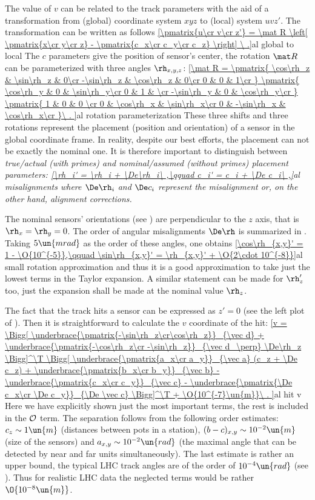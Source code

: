 The value of $v$ can be related to the track parameters with the aid of a transformation from (global) coordinate system $xyz$ to (local) system $uvz'$. The transformation can be written as follows
\eqref{\pmatrix{u\cr v\cr z'} = \mat R \left[ \pmatrix{x\cr y\cr z}  - \pmatrix{c_x\cr c_y\cr c_z}  \right] \ .}{al global to local}
The $c$ parameters give the position of sensor's center, the rotation $\mat R$ can be parameterized with three angles $\rh_{x,y,z}$:
\eqref{\mat R =
	\pmatrix{
		\cos\rh_z  & \sin\rh_z & 0\cr
		-\sin\rh_z & \cos\rh_z & 0\cr
		0		   & 0         & 1\cr
	}
	\pmatrix{
		\cos\rh_y  & 0 & \sin\rh_y\cr
		0		   & 1 &          \cr
		-\sin\rh_y & 0 & \cos\rh_y\cr
	}
	\pmatrix{
		1 & 0		   & 0        \cr
		0 & \cos\rh_x  & \sin\rh_x\cr
		0 & -\sin\rh_x & \cos\rh_x\cr
	}\ .
}{al rotation parameterization}
These three shifts and three rotations represent the placement (position and orientation) of a sensor in the global coordinate frame. In reality, despite our best efforts, the placement can not be exactly the nominal one. It is therefore important to distinguish between \em{true/actual} (with primes) and \em{nominal/assumed} (without primes) placement parameters:
\eqref{\rh_i' = \rh_i + \De\rh_i\ ,\qquad c_i' = c_i + \De c_i\ ,}{al misalignments}
where $\De\rh_i$ and $\De c_i$ represent the \em{misalignment} or, on the other hand, \em{alignment corrections}.

The nominal sensors' orientations (see ) are perpendicular to the $z$ axis, that is $\rh_x=\rh_y=0$. The order of angular misalignments $\De\rh$ is summarized in . Taking $5\un{mrad}$ as the order of these angles, one obtains
\eqref{\cos\rh_{x,y}' = 1 - \O{10^{-5}},\qquad \sin\rh_{x,y}' = \rh_{x,y}' + \O{2\cdot 10^{-8}}}{al small rotation approximation}
and thus it is a good approximation to take just the lowest terms in the Taylor expansion. A similar statement can be made for $\rh_z'$ too, just the expansion shall be made at the nominal value $\rh_z$.

The fact that the track  hits a sensor can be expressed as $z' = 0$ (see the left plot of ). Then it is straightforward to calculate the $v$ coordinate of the hit:
\eqref{v =
	\Bigg[
		\underbrace{\pmatrix{-\sin\rh_z\cr\cos\rh_z}}_{\vec d}
		+ \underbrace{\pmatrix{-\cos\rh_z\cr -\sin\rh_z}}_{\vec d_\perp} \De\rh_z
	\Bigg]^\T
	\Bigg[
		\underbrace{\pmatrix{a_x\cr a_y}}_{\vec a} (c_z + \De c_z)
		 + \underbrace{\pmatrix{b_x\cr b_y}}_{\vec b}
		 - \underbrace{\pmatrix{c_x\cr c_y}}_{\vec c}
		 - \underbrace{\pmatrix{\De c_x\cr \De c_y}}_{\De \vec c}
	\Bigg]^\T
	+ \O{10^{-7}\un{m}}\ .
}{al hit v}
Here we have explicitly shown just the most important terms, the rest is included in the $\cal O$ term. The separation follows from the following order estimates: $c_z \sim 1\un{m}$ (distances between pots in a station), $(b - c)_{x, y} \sim 10^{-2}\un{m}$ (size of the sensors) and $a_{x, y} \sim 10^{-2}\un{rad}$ (the maximal angle that can be detected by near and far units simultaneously). The last estimate is rather an upper bound, the typical LHC track angles are of the order of $10^{-4}\un{rad}$ (see ). Thus for realistic LHC data the neglected terms would be rather $\O{10^{-8}\un{m}}$.

